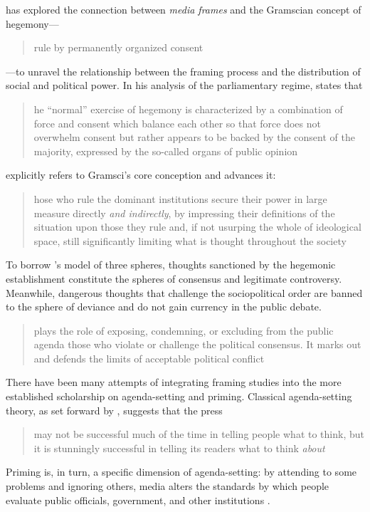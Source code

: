 \citeauthor{gitlin1980whole} has explored the connection between \emph{media frames} and the Gramscian concept of hegemony---\blockcquote[][I \S 48]{gramsci1975quaderni}{rule by permanently organized consent}---to unravel the relationship between the framing process and the distribution of social and political power. In his analysis of the parliamentary regime, \citeauthor{gramsci1975quaderni} states that \blockcquote[][I \S 48]{gramsci1975quaderni}[.]{he \enquote{normal} exercise of hegemony \textelp{} is characterized by a combination of force and consent which balance each other so that force does not overwhelm consent but rather appears to be backed by the consent of the majority, expressed by the so-called organs of public opinion} \citeauthor{gitlin1980whole} explicitly refers to Gramsci's core conception and advances it: \blockquote[{\autocites(emphasis in the original)[10]{gitlin1980whole}}][.]{hose who rule the dominant institutions secure their power in large measure directly \emph{and indirectly}, by impressing their definitions of the situation upon those they rule and, if not usurping the whole of ideological space, still significantly limiting what is thought throughout the society}

To borrow \citeauthor{hallin1989uncensored}'s model of three spheres, thoughts sanctioned by the hegemonic establishment constitute the spheres of consensus and legitimate controversy. Meanwhile, dangerous thoughts that challenge the sociopolitical order are banned to the sphere of deviance and do not gain currency in the public debate. \blockcquote[117]{hallin1989uncensored}[.]{ plays the role of exposing, condemning, or excluding from the public agenda those who violate or challenge the political consensus. It marks out and defends the limits of acceptable political conflict}

There have been many attempts of integrating framing studies into the more established scholarship on agenda-setting and priming. Classical agenda-setting theory, as set forward by \citeauthor{mccombs1972agenda}, suggests that the press \blockquote[{\autocites[13]{cohen1965press}[as cited in][]{mccombs1972agenda}}][.]{may not be successful much of the time in telling people what to think, but it is stunningly successful in telling its readers what to think \emph{about}} Priming is, in turn, a specific dimension of agenda-setting: by attending to some problems and ignoring others, media alters the standards by which people evaluate public officials, government, and other institutions \autocite{iyengar1982experimental}.

